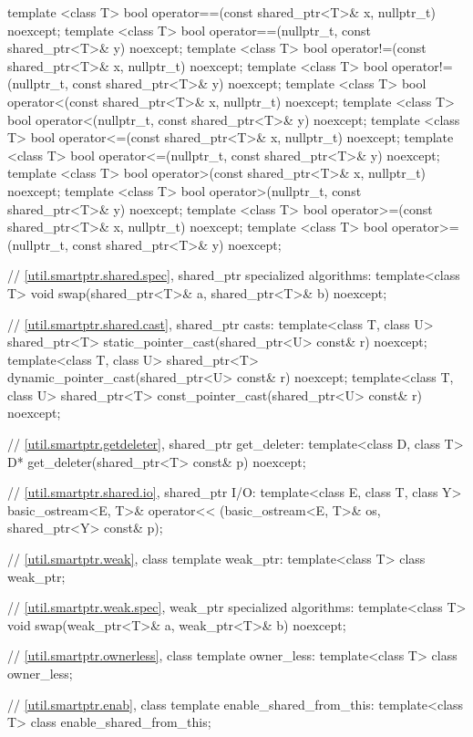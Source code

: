 \begin{codeblock}
{  template <class T>
    bool operator==(const shared_ptr<T>& x, nullptr_t) noexcept;
  template <class T>
    bool operator==(nullptr_t, const shared_ptr<T>& y) noexcept;
  template <class T>
    bool operator!=(const shared_ptr<T>& x, nullptr_t) noexcept;
  template <class T>
    bool operator!=(nullptr_t, const shared_ptr<T>& y) noexcept;
  template <class T>
    bool operator<(const shared_ptr<T>& x, nullptr_t) noexcept;
  template <class T>
    bool operator<(nullptr_t, const shared_ptr<T>& y) noexcept;
  template <class T>
    bool operator<=(const shared_ptr<T>& x, nullptr_t) noexcept;
  template <class T>
    bool operator<=(nullptr_t, const shared_ptr<T>& y) noexcept;
  template <class T>
    bool operator>(const shared_ptr<T>& x, nullptr_t) noexcept;
  template <class T>
    bool operator>(nullptr_t, const shared_ptr<T>& y) noexcept;
  template <class T>
    bool operator>=(const shared_ptr<T>& x, nullptr_t) noexcept;
  template <class T>
    bool operator>=(nullptr_t, const shared_ptr<T>& y) noexcept;

  // \ref{util.smartptr.shared.spec}, shared_ptr specialized algorithms:
  template<class T> void swap(shared_ptr<T>& a, shared_ptr<T>& b) noexcept;

  // \ref{util.smartptr.shared.cast}, shared_ptr casts:
  template<class T, class U>
    shared_ptr<T> static_pointer_cast(shared_ptr<U> const& r) noexcept;
  template<class T, class U>
    shared_ptr<T> dynamic_pointer_cast(shared_ptr<U> const& r) noexcept;
  template<class T, class U>
    shared_ptr<T> const_pointer_cast(shared_ptr<U> const& r) noexcept;

  // \ref{util.smartptr.getdeleter}, shared_ptr get_deleter:
  template<class D, class T> D* get_deleter(shared_ptr<T> const& p) noexcept;

  // \ref{util.smartptr.shared.io}, shared_ptr I/O:
  template<class E, class T, class Y>
    basic_ostream<E, T>& operator<< (basic_ostream<E, T>& os, shared_ptr<Y> const& p);

  // \ref{util.smartptr.weak}, class template weak_ptr:
  template<class T> class weak_ptr;

  // \ref{util.smartptr.weak.spec}, weak_ptr specialized algorithms:
  template<class T> void swap(weak_ptr<T>& a, weak_ptr<T>& b) noexcept;

  // \ref{util.smartptr.ownerless}, class template owner_less:
  template<class T> class owner_less;

  // \ref{util.smartptr.enab}, class template enable_shared_from_this:
  template<class T> class enable_shared_from_this;

}
\end{codeblock}
